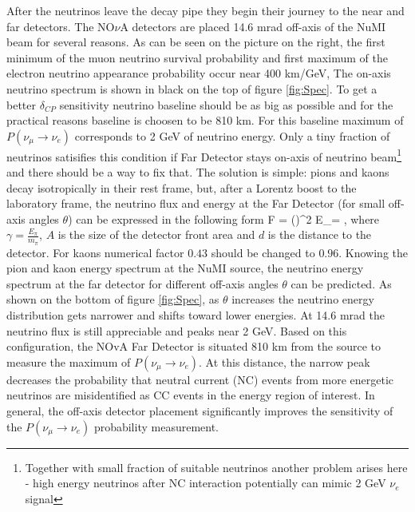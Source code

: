 After the neutrinos leave the decay pipe they begin their journey to the near and far detectors.
The NO$\nu$A detectors are placed 14.6 mrad off-axis of the NuMI beam for several reasons. As can
be seen on the picture on the right, the first minimum of the muon neutrino survival
probability and first maximum of the electron neutrino appearance probability occur near 400 km/GeV,
The on-axis neutrino spectrum is shown in black on the top of figure \ref{fig:Spec}. To get a better 
$\delta_{CP}$ sensitivity neutrino baseline should be as big as possible and for the practical reasons
baseline is choosen to be 810 km. For this baseline maximum of $P(\nu_\mu \rightarrow \nu_e)$ corresponds
to 2 GeV of neutrino energy. Only a tiny fraction of neutrinos satisifies this condition if Far Detector 
stays on-axis of neutrino beam\footnote{Together with small fraction of suitable neutrinos another problem 
arises here - high energy neutrinos after NC interaction potentially can mimic 2 GeV $\nu_e$ signal} and 
there should be a way to fix that. The solution is simple: pions and kaons decay isotropically in their 
rest frame, but, after a Lorentz boost to the laboratory frame, the neutrino flux and energy at the Far 
Detector (for small off-axis angles $\theta$) can be expressed in the following form
\be
F = \Big(\Big)^2
\ee
\be
E_\nu = ,
\ee
where $\gamma = \frac{E_\pi}{m_\pi}$, $A$ is the size of the detector front area and $d$ is 
the distance to the detector. For kaons numerical factor $0.43$ should be changed to $0.96$. 
Knowing the pion and kaon energy spectrum at the NuMI source, the neutrino energy spectrum at
the far detector for different off-axis angles $\theta$ can be predicted. As shown on the bottom of
figure \ref{fig:Spec}, as $\theta$ increases the neutrino energy distribution gets narrower and shifts
toward lower energies. At 14.6 mrad the neutrino flux is still appreciable and peaks near 2 GeV.
Based on this configuration, the NOvA Far Detector is situated 810 km from the source to measure
the maximum of $P(\nu_\mu \rightarrow \nu_e)$. At this distance, the narrow peak decreases the
probability that neutral current (NC) events from more energetic neutrinos are misidentified
as CC events in the energy region of interest. In general, the off-axis detector placement
significantly improves the sensitivity of the $P(\nu_\mu \rightarrow \nu_e)$ probability measurement.
